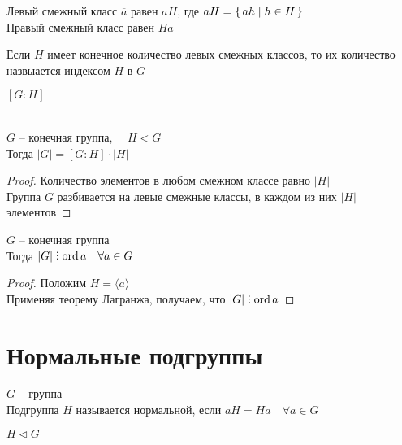 \begin{property}
	Левый смежный класс $ \overline{a} $ равен $ aH $, где $ aH = \set{ah | h \in H} $ \\
	Правый смежный класс равен $ Ha $
\end{property}

\begin{definition}
	Если $ H $ имеет конечное количество левых смежных классов, то их количество назвыается индексом $ H $ в $ G $
\end{definition}

\begin{notation}
	$ [G : H] $
\end{notation}

\begin{theorem}[Лагранжа]
	\hfill \\
	$ G $ -- конечная группа, $ \quad H < G $ \\
	Тогда $ |G| = [G : H] \cdot |H| $
\end{theorem}

\begin{proof}
	Количество элементов в любом смежном классе равно $ |H| $ \\
	Группа $ G $ разбивается на левые смежные классы, в каждом из них $ |H| $ элементов
\end{proof}

\begin{implication}
	$ G $ -- конечная группа \\
	Тогда $ |G| \divby \ord a \quad \forall a \in G $
\end{implication}

\begin{proof}
	Положим $ H = \langle a \rangle $ \\
	Применяя теорему Лагранжа, получаем, что $ |G| \divby \ord a $
\end{proof}

\section{Нормальные подгруппы}

\begin{definition}
	$ G $ -- группа \\
	Подгруппа $ H $ называется нормальной, если $ aH = Ha \quad \forall a \in G $
\end{definition}

\begin{notation}
	$ H \vartriangleleft G $
\end{notation}


